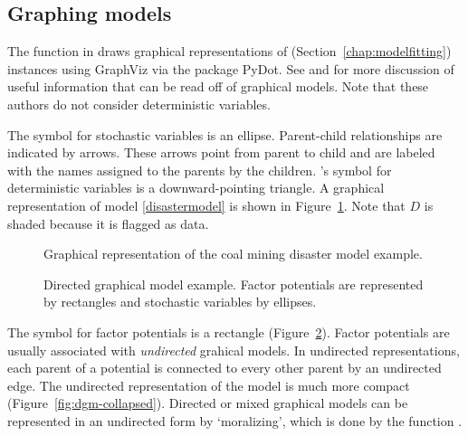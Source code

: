 \documentclass[]{jss}
\begin{document}
\subsection{Graphing models} \label{graphical}


The function  in  draws graphical representations of  (Section~\ref{chap:modelfitting}) instances using GraphViz via the  package PyDot. See \citet{dawidmarkov} and \citet{Jordan:2004p5439} for more discussion of useful information that can be read off of graphical models. Note that these authors do not consider deterministic variables.

The symbol for stochastic variables is an ellipse. Parent-child relationships are indicated by arrows. These arrows point from parent to child and are labeled with the names assigned to the parents by the children. 's symbol for deterministic variables is a downward-pointing triangle. A graphical representation of model \ref{disastermodel} is shown in Figure~\ref{fig:disaster-dag}. Note that $D$ is shaded because it is flagged as data.

\begin{figure}[h!]
\begin{center}
    \caption{Graphical representation of the coal mining disaster model example.}
	\label{fig:disaster-dag}
\end{center}
\end{figure}



\begin{figure}[h!]
\begin{center}
    \caption{Directed graphical model example. Factor potentials are represented by rectangles and stochastic variables by ellipses.}
    \label{fig:dgm}
\end{center}
\end{figure}

The symbol for factor potentials is a rectangle (Figure~\ref{fig:dgm}). Factor potentials are usually associated with \emph{undirected} grahical models. In undirected representations, each parent of a potential is connected to every other parent by an undirected edge. The undirected representation of the model is much more compact (Figure~\ref{fig:dgm-collapsed}). Directed or mixed graphical models can be represented in an undirected form by `moralizing', which is done by the function .
\end{document}
